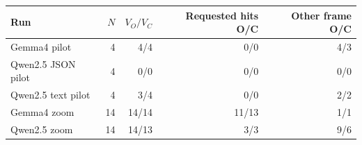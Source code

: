 \begin{tabular}{lrrrr}
\toprule
Run & $N$ & $V_O/V_C$ & Requested hits O/C & Other frame O/C \\
\midrule
Gemma4 pilot & 4 & 4/4 & 0/0 & 4/3 \\
Qwen2.5 JSON pilot & 4 & 0/0 & 0/0 & 0/0 \\
Qwen2.5 text pilot & 4 & 3/4 & 0/0 & 2/2 \\
Gemma4 zoom & 14 & 14/14 & 11/13 & 1/1 \\
Qwen2.5 zoom & 14 & 14/13 & 3/3 & 9/6 \\
\bottomrule
\end{tabular}
